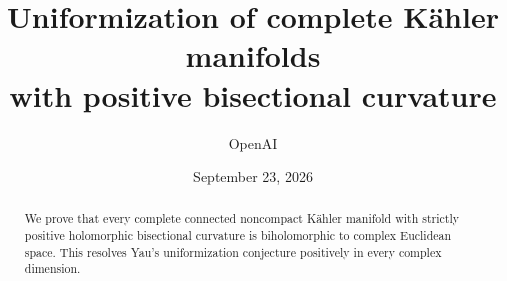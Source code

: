 \documentclass[11pt]{article}
\title{Uniformization of complete K\"ahler manifolds\protect\\
with positive bisectional curvature}
\author{OpenAI}
\date{September 23, 2026}
\theoremstyle{definition}
\theoremstyle{remark}
\numberwithin{equation}{section}
\begin{document}
\maketitle
\begin{abstract}
We prove that every complete connected noncompact K\"ahler manifold with
strictly positive holomorphic bisectional curvature is biholomorphic to
complex Euclidean space. This resolves Yau's uniformization conjecture
positively in every complex dimension.
\end{abstract}
\tableofcontents










\end{document}
